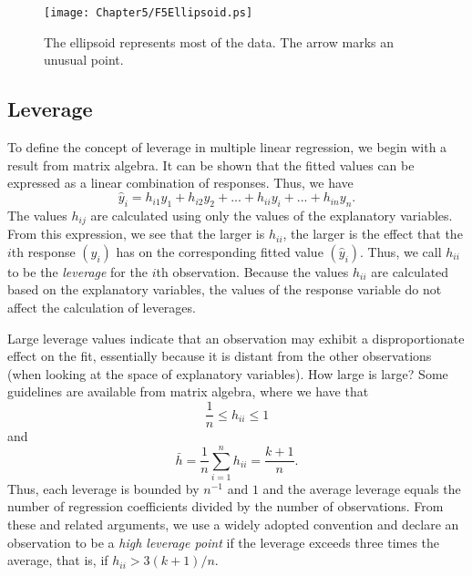 \begin{figure}[htp]
  \begin{center}
    \texttt{[image: Chapter5/F5Ellipsoid.ps]}
    \caption{\label{F5:Ellipsoid} \small  The ellipsoid
represents most of the data. The arrow marks an unusual point.}
  \end{center}
\end{figure}



\subsection{Leverage}\label{S5:Leverage}

To define the concept of leverage in multiple linear regression, we
begin with a result from matrix algebra. It can be shown that the
fitted values can be expressed as a linear combination of responses.
Thus, we have
\begin{equation*}
\hat{y}_i=h_{i1}y_1+h_{i2}y_2+...+h_{ii}y_i+...+h_{in}y_{n}.
\end{equation*}
The values $h_{ij}$ are calculated using only the values of the
explanatory variables. From this expression, we see that the larger
is $h_{ii}$, the larger is the effect that the $i$th response
$(y_i)$ has on the corresponding fitted value $(\hat{y}_i)$. Thus,
we call $h_{ii}$ to be the \textit{leverage }for the $i$th
observation. Because the values $h_{ii}$ are calculated based on the
explanatory variables, the values of the response variable do not
affect the calculation of leverages.

Large leverage values indicate that an observation may exhibit a
disproportionate effect on the fit, essentially because it is
distant from the other observations (when looking at the space of
explanatory variables). How large is large? Some guidelines are
available from matrix algebra, where we have that
\begin{equation*}
\frac{1}{n}\leq h_{ii}\leq 1
\end{equation*}
and
\begin{equation*}
\bar{h}=\frac{1}{n}\sum_{i=1}^{n}h_{ii}=\frac{k+1}{n}.
\end{equation*}
Thus, each leverage is bounded by $n^{-1}$ and $1$ and the average
leverage equals the number of regression coefficients divided by the
number of observations. From these and related arguments, we use a
widely adopted convention and declare an observation to be a
\textit{high leverage point} if the leverage exceeds three times the
average, that is, if $h_{ii}>3(k+1)/n $.

